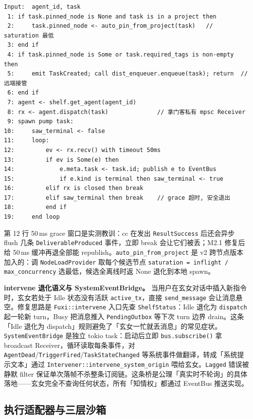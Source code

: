 \begin{lstlisting}[language=Pseudo, caption=本地任务派发主循环（fuxi-orchestrator/src/fuxi.rs::dispatch）, label=lst:dispatch-main]
Input:  agent_id, task
 1: if task.pinned_node is None and task is in a project then
 2:     task.pinned_node <- auto_pin_from_project(task)   // saturation 最低
 3: end if
 4: if task.pinned_node is Some or task.required_tags is non-empty then
 5:     emit TaskCreated; call dist_enqueuer.enqueue(task); return  // 远端接管
 6: end if
 7: agent <- shelf.get_agent(agent_id)
 8: rx <- agent.dispatch(task)              // 拿门客私有 mpsc Receiver
 9: spawn pump task:
10:     saw_terminal <- false
11:     loop:
12:         ev <- rx.recv() with timeout 50ms
13:         if ev is Some(e) then
14:             e.meta.task <- task.id; publish e to EventBus
15:             if e.kind is terminal then saw_terminal <- true
16:         elif rx is closed then break
17:         elif saw_terminal then break    // grace 超时, 安全退出
18:         end if
19:     end loop
\end{lstlisting}

第 12 行 50\,ms grace 窗口是实测教训：cc 在发出 \texttt{ResultSuccess} 后还会异步 flush 几条 \texttt{DeliverableProduced} 事件，立即 break 会让它们被丢；M2.1 修复后给 50\,ms 缓冲再退全部能 republish。\texttt{auto\_pin\_from\_project} 是 v2 跨节点版本加入的：调 \texttt{NodeLoadProvider} 取每个候选节点 \texttt{saturation = inflight / max\_concurrency} 选最低，候选全离线时返 None 退化到本地 spawn。

\textbf{intervene 退化语义与 SystemEventBridge。} 当用户在玄女对话中插入新指令时，玄女若处于 Idle 状态没有活跃 \texttt{active\_tx}，直接 \texttt{send\_message} 会让消息悬空。修复思路是 \texttt{Fuxi::intervene} 入口先查 \texttt{ShelfStatus}：Idle 退化为 \texttt{dispatch} 起一轮新 turn，Busy 把消息推入 \texttt{PendingOutbox} 等下次 turn 边界 drain。这条「Idle 退化为 dispatch」规则避免了「玄女一忙就丢消息」的常见症状。\texttt{SystemEventBridge} 是独立 tokio task：启动后立即 \texttt{bus.subscribe()} 拿 broadcast Receiver，循环读取每条事件，对 \texttt{AgentDead}/\texttt{TriggerFired}/\texttt{TaskStateChanged} 等系统事件做翻译，转成「系统提示文本」通过 \texttt{Intervener::intervene\_system\_origin} 喂给玄女。\texttt{Lagged} 错误被静默 filter 保证单次落帧不杀整条订阅链。这条桥是公理「真实时不轮询」的具体落地——玄女完全不查询任何状态，所有「知情权」都通过 EventBus 推送实现。

\subsection{执行适配器与三层沙箱}
\label{subsec:adapter-workspace}

